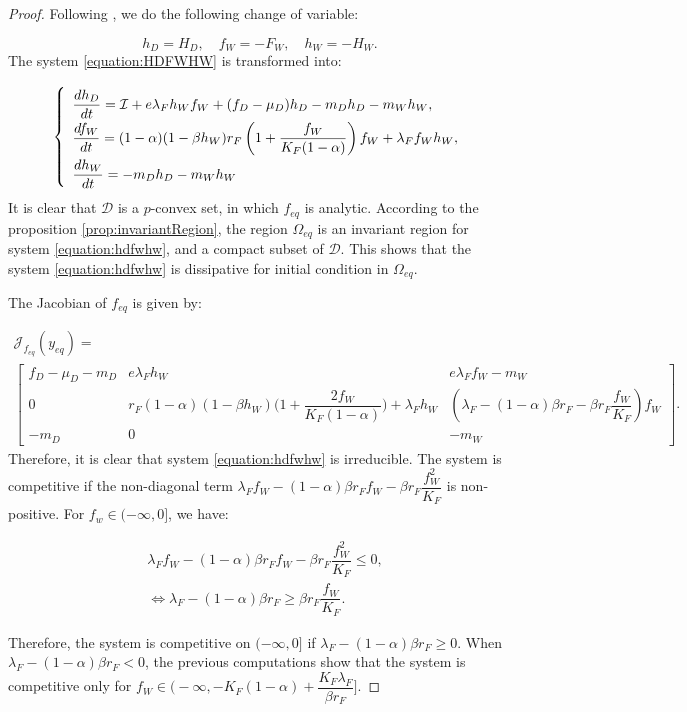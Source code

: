 \documentclass{article}
\newcommand{\lfw}{\lambda_{F}}
\newcommand{\lfw}{\lambda_{F}}
\newcommand{\cI}{\mathcal{I}}
\theoremstyle{definition}
\theoremstyle{remark}
\begin{document}
\begin{proof}
Following \cite{wang_predator-prey_1997}, we do the following change of variable: 

\begin{equation}\label{equation:change of variable}
h_D =  H_D, \quad f_W = -F_W, \quad h_W = -H_W.
\end{equation} The system \eqref{equation:HDFWHW} is transformed into:

\begin{equation}
\def\arraystretch{2}
\left\{ \begin{array}{l}
\dfrac{dh_D}{dt}= \cI + e\lfw h_W f_W + (f_D - \mu_D) h_D - m_D h_D - m_W h_W, \\
\dfrac{df_W}{dt} = (1-\alpha)(1 - \beta h_W) r_F \left(1 + \dfrac{f_W}{K_F(1-\alpha)} \right) f_W + \lfw f_W h_W, \\
\dfrac{dh_W}{dt}= -m_D h_D - m_W h_W 
\end{array} \right.
\end{equation}
It is clear that $\mathcal{D}$ is a $p$-convex set, in which $f_{eq}$ is analytic. According to the proposition \ref{prop:invariantRegion}, the region $\Omega_{eq}$ is an invariant region for system \eqref{equation:hdfwhw}, and a compact subset of $\mathcal{D}$. This shows that the system \eqref{equation:hdfwhw} is dissipative for initial condition in  $\Omega_{eq}$.

The Jacobian of $f_{eq}$ is given by:

{\footnotesize
\begin{multline}
\mathcal{J}_{f_{eq}}(y_{eq}) = \\ \begin{bmatrix}
f_D -\mu_D - m_D & e \lfw h_W & e \lfw f_W - m_W \\
0 & r_F (1-\alpha)(1-\beta h_W) \Big(1 + \dfrac{2 f_W}{K_F(1-\alpha)}\Big) + \lfw  h_W & \left(\lfw- (1-\alpha)\beta r_F - \beta r_F \dfrac{f_W}{K_F} \right)f_W\\
-m_D & 0 & -m_W
\end{bmatrix}.
\label{equation:jacobianMatrix compet}
\end{multline}}
Therefore, it is clear that system \eqref{equation:hdfwhw} is irreducible. The system is competitive if the non-diagonal term $\lfw f_W - (1-\alpha)\beta r_F f_W - \beta r_F \dfrac{f_W^2}{K_F}$ is non-positive. For $f_w \in (-\infty, 0]$, we have:

\begin{align*}
&\lfw f_W - (1-\alpha)\beta r_F f_W - \beta r_F \dfrac{f_W^2}{K_F} \leq 0, \\
&\Leftrightarrow \lfw - (1-\alpha)\beta r_F \geq \beta r_F \dfrac{f_W}{K_F}.
\end{align*}

Therefore, the system is competitive on $(-\infty, 0]$ if $\lfw - (1-\alpha)\beta r_F \geq 0$. When $\lfw - (1-\alpha)\beta r_F<0$, the previous computations show that the system is competitive only for $f_W \in \Big(-\infty, -K_F(1-\alpha) + \dfrac{K_F \lfw}{\beta r_F}\Big]$. 
\end{proof}
\end{document}
